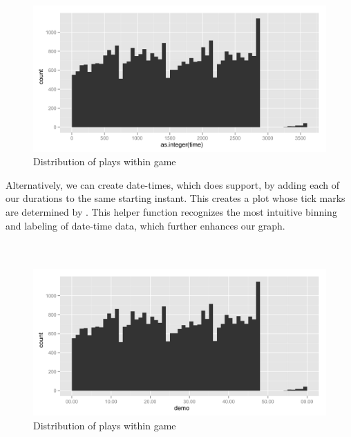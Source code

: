\documentclass[article]{jss}
\begin{document}
\\

\begin{figure}[htpb]
  \centering
  \includegraphics[width=\textwidth]{play-time-histogram.png}        
  \caption{Distribution of plays within game}
  \label{fig:plays}
\end{figure}

Alternatively, we can create date-times, which  does support, by adding each of our durations to the same starting instant. This creates a plot whose tick marks are determined by . This helper function recognizes the most intuitive binning and labeling of date-time data, which further enhances our graph.\\

\\
\\

\begin{figure}[htpb]
  \centering
  \includegraphics[width=\textwidth]{play-time-histogram2.png}        
  \caption{Distribution of plays within game}
  \label{fig:plays}
\end{figure}
\end{document}
